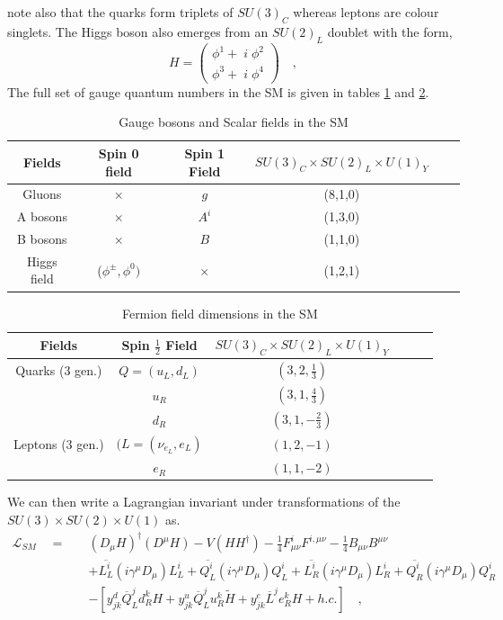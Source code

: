 \documentclass[12pt]{article}
\begin{document}
%
note also that the quarks form triplets of $SU(3)_C$ whereas leptons are colour singlets. The Higgs boson also emerges from an $SU(2)_L$ doublet with the form,
%
\begin{equation}
H=\begin{pmatrix}
\phi^1 + \; i \; \phi^2 \\
\phi^3 + \; i \; \phi^4  
\end{pmatrix} \quad , 
\end{equation}
%
%
%
The full set of gauge quantum numbers in the SM is given in tables \ref{table1} and \ref{table2}. 
%
\begin{table}[H]
\centering
\caption{Gauge bosons and Scalar fields in the SM}
\label{table1}
\begin{tabular}{@{}cccccc@{}}
  \hline	
 Fields & Spin 0 field & Spin 1 Field & $SU(3)_C \times SU(2)_L \times U(1)_Y$  \\
  \hline	
 Gluons  & $\times$  & $g$ & (8,1,0) \\	
A bosons & $\times$  & $A^i$ & (1,3,0)   \\
B bosons & $\times$  & $B$ & (1,1,0)   \\
Higgs field & ($\phi^\pm, \phi^0 )$  & $\times$ & (1,2,1) \\ \hline
\end{tabular}
\end{table}
%
%
\begin{table}[H]
\centering
\caption{Fermion field dimensions in the SM}
\label{table2}
\begin{tabular}{@{}cccccc@{}}
  \hline	
 Fields & Spin $\frac{1}{2}$ Field & $SU(3)_C \times SU(2)_L \times U(1)_Y$  \\
  \hline	
Quarks (3 gen.) & $Q=(u_L,d_L)$ & $(3,2,\frac{1}{3})$ \\	
$\quad$        & $u_R$ & $(3,1,\frac{4}{3})$   \\
$\quad$   & $d_R$ & $(3,1, -\frac{2}{3})$   \\
Leptons (3 gen.) & $(L=(\nu_{e_L}, e_L )$ & $(1,2,-1)$  \\
$\quad$   & $e_R$ & $(1,1,-2)   $ \\ \hline

\end{tabular}
\end{table}
%
We can then write a Lagrangian invariant under transformations of the $SU(3) \times SU(2) \times U(1)$ as.
%
\begin{align}
\mathcal{L}_{SM} \quad = \quad & (D_\mu H)^\dagger (D^\mu H) - V (H H^\dagger) -  \frac{1}{4} F^i_{\mu \nu} F^{i , \mu \nu} - \frac{1}{4} B_{\mu \nu} B^{\mu \nu} \nonumber \\ 
& + \overline{L_L^i} (i \gamma^\mu D_\mu)  L_L^i +  \overline{Q^i_L} (i \gamma^\mu D_\mu)  Q^i_L +  \overline{L_R^i} (i \gamma^\mu D_\mu)  L_R^i +  \overline{Q^i_R} (i \gamma^\mu D_\mu)  Q^i_R \label{SMfullL}    \\  
 & - [y^d_{jk}\overline{Q}^j_{L} d^k_{R} H +  y_{jk}^u \overline{Q}^j_{L} u^k_{R} \tilde{H} + y^e_{jk} \overline{L}^j e^k_{R} H  + h.c. ] \nonumber \quad , 
\end{align}
\end{document}
